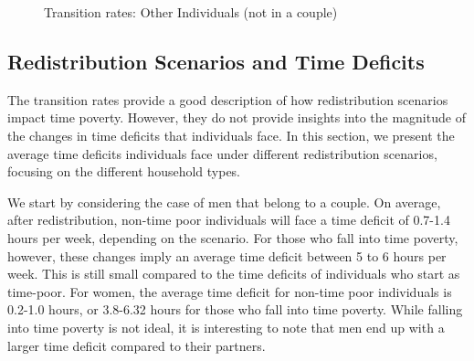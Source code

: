 \documentclass[
  11pt,
]{article}
\begin{document}
\begin{figure}[H]


\caption{\label{fig-transition3}Transition rates: Other Individuals (not
in a couple)}

\end{figure}%

\subsection{Redistribution Scenarios and Time
Deficits}\label{redistribution-scenarios-and-time-deficits}

The transition rates provide a good description of how redistribution
scenarios impact time poverty. However, they do not provide insights
into the magnitude of the changes in time deficits that individuals
face. In this section, we present the average time deficits individuals
face under different redistribution scenarios, focusing on the different
household types.

We start by considering the case of men that belong to a couple. On
average, after redistribution, non-time poor individuals will face a
time deficit of 0.7-1.4 hours per week, depending on the scenario. For
those who fall into time poverty, however, these changes imply an
average time deficit between 5 to 6 hours per week. This is still small
compared to the time deficits of individuals who start as time-poor. For
women, the average time deficit for non-time poor individuals is 0.2-1.0
hours, or 3.8-6.32 hours for those who fall into time poverty. While
falling into time poverty is not ideal, it is interesting to note that
men end up with a larger time deficit compared to their partners.
\end{document}
